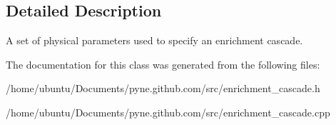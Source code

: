 \subsection{Detailed Description}
A set of physical parameters used to specify an enrichment cascade. 

The documentation for this class was generated from the following files\+:\begin{DoxyCompactItemize}
\item 
/home/ubuntu/\+Documents/pyne.\+github.\+com/src/enrichment\+\_\+cascade.\+h\item 
/home/ubuntu/\+Documents/pyne.\+github.\+com/src/enrichment\+\_\+cascade.\+cpp\end{DoxyCompactItemize}
